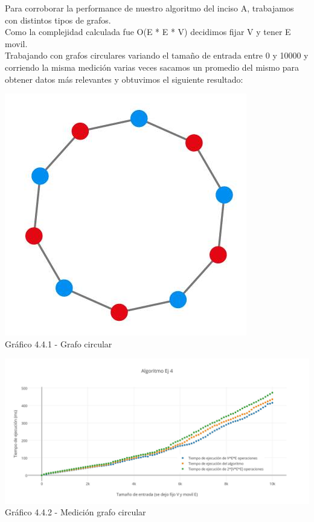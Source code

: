 \indent Para corroborar la performance de nuestro algoritmo del inciso A, trabajamos con distintos tipos de grafos.\\

Como la complejidad calculada fue O(E * E * V) decidimos fijar V y tener E movil.\\
Trabajando con grafos circulares variando el tamaño de entrada entre 0 y 10000 y corriendo la misma medición varias veces sacamos un promedio del mismo para obtener datos  más relevantes y obtuvimos el siguiente resultado:

\vspace*{0.3cm} \vspace*{0.3cm}
  \begin{center}
 \includegraphics[scale=0.5]{./ej4/circular.jpg}
 	{\\Gráfico 4.4.1 - Grafo circular}
  \end{center}
  \vspace*{0.3cm}
  
  \vspace*{0.3cm} \vspace*{0.3cm}
  \begin{center}
 \includegraphics[scale=0.28]{./ej4/circular2.jpg}
 	{Gráfico 4.4.2 - Medición grafo circular}
  \end{center}
  \vspace*{0.3cm}


